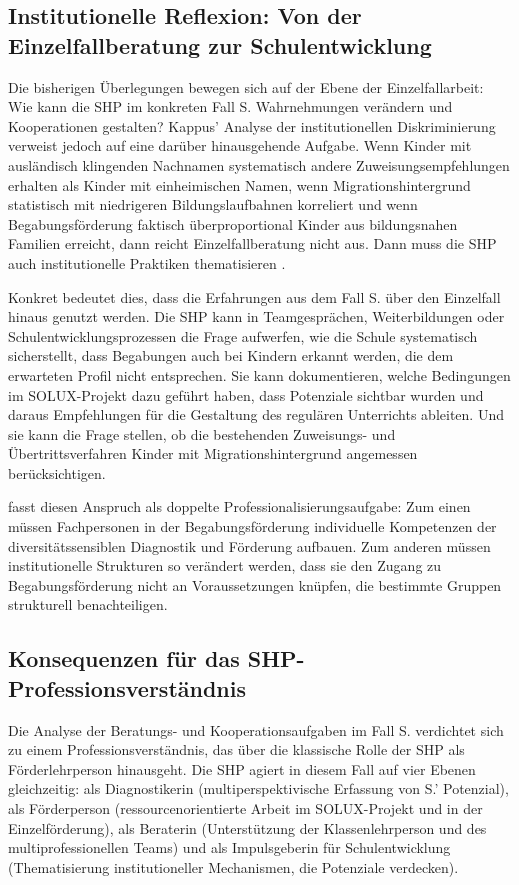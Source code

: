 \documentclass[ngerman, a4paper]{article}
\begin{document}
\subsection{Institutionelle Reflexion: Von der Einzelfallberatung zur Schulentwicklung}

Die bisherigen Überlegungen bewegen sich auf der Ebene der Einzelfallarbeit: Wie
kann die SHP im konkreten Fall S. Wahrnehmungen verändern und Kooperationen
gestalten? Kappus' Analyse der institutionellen Diskriminierung verweist jedoch
auf eine darüber hinausgehende Aufgabe. Wenn Kinder mit ausländisch klingenden
Nachnamen systematisch andere Zuweisungsempfehlungen erhalten als Kinder mit
einheimischen Namen, wenn Migrationshintergrund statistisch mit niedrigeren
Bildungslaufbahnen korreliert und wenn Begabungsförderung faktisch
überproportional Kinder aus bildungsnahen Familien erreicht, dann reicht
Einzelfallberatung nicht aus. Dann muss die SHP auch institutionelle Praktiken
thematisieren \parencite[S.\,63--77]{kappus2010migration}.

Konkret bedeutet dies, dass die Erfahrungen aus dem Fall S. über den Einzelfall
hinaus genutzt werden. Die SHP kann in Teamgesprächen, Weiterbildungen oder
Schulentwicklungsprozessen die Frage aufwerfen, wie die Schule systematisch
sicherstellt, dass Begabungen auch bei Kindern erkannt werden, die dem
erwarteten Profil nicht entsprechen. Sie kann dokumentieren, welche Bedingungen
im SOLUX-Projekt dazu geführt haben, dass Potenziale sichtbar wurden und
daraus Empfehlungen für die Gestaltung des regulären Unterrichts ableiten.
Und sie kann die Frage stellen, ob die bestehenden Zuweisungs- und
Übertrittsverfahren Kinder mit Migrationshintergrund angemessen berücksichtigen.

\textcite[S.\,161,\,163\psq]{macha2019gender} fasst diesen Anspruch als doppelte Professionalisierungsaufgabe: Zum einen
müssen Fachpersonen in der Begabungsförderung individuelle Kompetenzen der
diversitätssensiblen Diagnostik und Förderung aufbauen. Zum anderen müssen
institutionelle Strukturen so verändert werden, dass sie den Zugang zu
Begabungsförderung nicht an Voraussetzungen knüpfen, die bestimmte
Gruppen strukturell benachteiligen.

\subsection{Konsequenzen für das SHP-Professionsverständnis}

Die Analyse der Beratungs- und Kooperationsaufgaben im Fall S. verdichtet sich
zu einem Professionsverständnis, das über die klassische Rolle der SHP als
Förderlehrperson hinausgeht. Die SHP agiert in diesem Fall auf vier Ebenen
gleichzeitig: als Diagnostikerin (multiperspektivische Erfassung von S.'
Potenzial), als Förderperson (ressourcenorientierte Arbeit im SOLUX-Projekt und
in der Einzelförderung), als Beraterin (Unterstützung der Klassenlehrperson und
des multiprofessionellen Teams) und als Impulsgeberin für Schulentwicklung
(Thematisierung institutioneller Mechanismen, die Potenziale verdecken).
\end{document}
